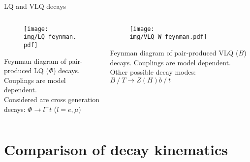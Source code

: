 \documentclass[aspectratio=1610, professionalfonts, 9pt]{beamer}
\begin{document}
\begin{frame}{LQ and VLQ decays}
    \begin{columns}
        \begin{column}{0.5\textwidth}
            \begin{figure}
                \centering
                \texttt{[image: img/LQ\_feynman.pdf]}
                \label{fig:LQ_fm}
            \end{figure}
            Feynman diagram of pair-produced LQ (\(\Phi\)) decays. \\
            Couplings are model dependent. \\
            Considered are cross generation decays: \(\Phi \rightarrow l^- t\) (\(l = e, \mu\))
        \end{column}
        \begin{column}{0.5\textwidth}
            \begin{figure}
                \centering
                \texttt{[image: img/VLQ\_W\_feynman.pdf]}
                \label{fig:VLQ_fm}
            \end{figure}
            Feynman diagram of pair-produced VLQ (\(B\)) decays.
            Couplings are model dependent. \\
            Other possible decay modes: \(B\mathrel{/}T \rightarrow Z (H) b\mathrel{/}t\)
        \end{column}
    \end{columns}
\end{frame}
\section{Comparison of decay kinematics}
\end{document}
